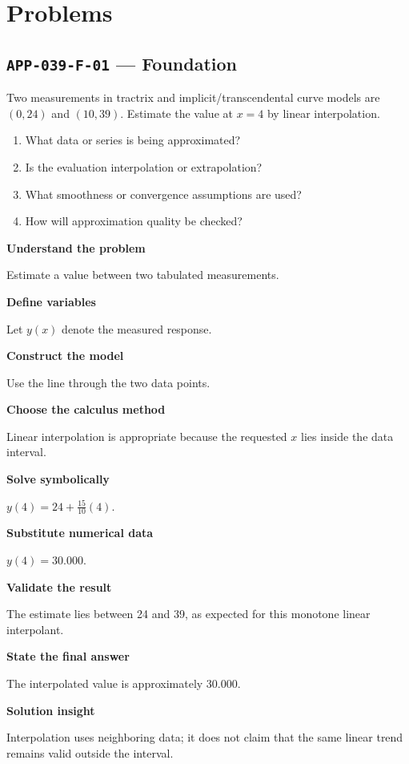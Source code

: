 \documentclass[11pt]{book}
\newcommand{\pid}[1]{\texttt{#1}}
\begin{document}
\section*{Problems}
\subsection*{\pid{APP-039-F-01} — Foundation}
\begin{problembox}
Two measurements in tractrix and implicit/transcendental curve models are $(0,24)$ and $(10,39)$. Estimate the value at $x=4$ by linear interpolation.
\end{problembox}
\begin{promptbox}\begin{enumerate}
\item What data or series is being approximated?
\item Is the evaluation interpolation or extrapolation?
\item What smoothness or convergence assumptions are used?
\item How will approximation quality be checked?
\end{enumerate}\end{promptbox}
\begin{solutionbox}
\textbf{Understand the problem}\par Estimate a value between two tabulated measurements.\par\medskip
\textbf{Define variables}\par Let $y(x)$ denote the measured response.\par\medskip
\textbf{Construct the model}\par Use the line through the two data points.\par\medskip
\textbf{Choose the calculus method}\par Linear interpolation is appropriate because the requested $x$ lies inside the data interval.\par\medskip
\textbf{Solve symbolically}\par $y(4)=24+\frac{15}{10}(4)$.\par\medskip
\textbf{Substitute numerical data}\par $y(4)=30.000$.\par\medskip
\textbf{Validate the result}\par The estimate lies between 24 and 39, as expected for this monotone linear interpolant.\par\medskip
\textbf{State the final answer}\par The interpolated value is approximately $30.000$.\par\medskip
\textbf{Solution insight}\par Interpolation uses neighboring data; it does not claim that the same linear trend remains valid outside the interval.\par\medskip
\end{solutionbox}
\end{document}
